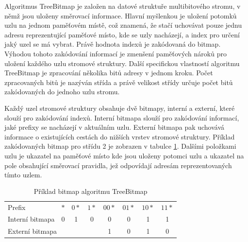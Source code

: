Algoritmus TreeBitmap je založen na datové struktuře multibitového stromu, v němž jsou uloženy směrovací informace.
Hlavní myšlenkou je uložení potomků uzlu na jednom paměťovém místě, což znamená, že stačí uchovávat pouze jednu
adresu reprezentující paměťové místo, kde se uzly nacházejí, a index pro určení jaký uzel se má vybrat. Právě
hodnota indexů je zakódovaná do bitmap.
Výhodou tohoto zakódování informací je zmenšení paměťových nároků pro uložení každého uzlu stromové struktury.
Další specifickou vlastností algoritmu TreeBitmap je zpracování několika bitů adresy v jednom kroku.
Počet zpracovaných bitů je nazýván střída a právě velikost střídy určuje počet bitů zakódovaných do jednoho uzlu stromu.

Každý uzel stromové struktury obsahuje dvě bitmapy, interní a externí, které slouží pro zakódování indexů.
Interní bitmapa slouží pro zakódování informací, jaké prefixy se nacházejí v aktuálním uzlu.
Externí bitmapa pak uchovává informace o existujících cestách do nižších vrstev stromové struktury.
Příklad zakódovaných bitmap pro střídu 2 je zobrazen v tabulce \ref{tab:tbm-bitmaps}.
Dalšími položkami uzlu je ukazatel na paměťové místo kde jsou uloženy potomci uzlu a ukazatel na pole obsahující směrovací pravidla, jež odpovídají adresám reprezentovaných tímto uzlem.

\begin{table}
	\center
    \begin{tabular}{|l||c|c|c|c|c|c|c|}
    \hline
    Prefix & $*$ & $0*$ & $1*$ & $00*$ & $01*$ & $10*$ & $11*$ \\ \hhline{|=#=|=|=|=|=|=|=|}
    Interní bitmapa & 0 & 1 & 0 & 0 & 0 & 1 & 1 \\ \hline
    \multicolumn{4}{|l|}{Externí bitmapa} & 1 & 0 & 1 & 0 \\ \hline
    \end{tabular}
    \caption{Příklad bitmap algoritmu TreeBitmap}
    \label{tab:tbm-bitmaps}
\end{table}

